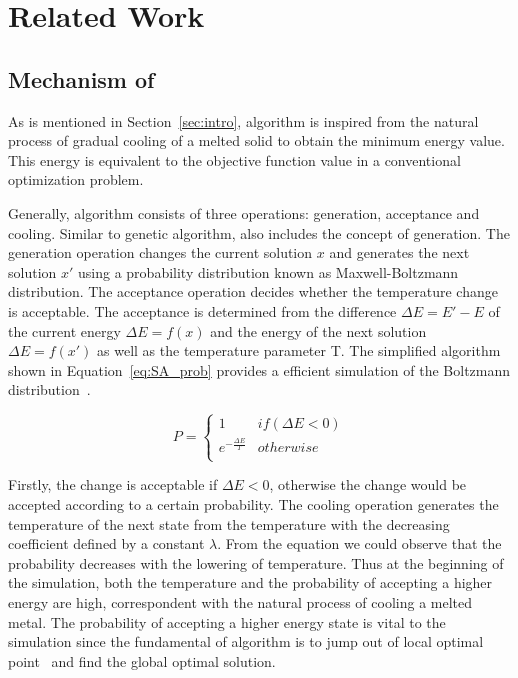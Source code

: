 \section{Related Work}
\label{sec:related}
\subsection{Mechanism of \SA}
As is mentioned in Section~\ref{sec:intro}, \SA algorithm is inspired from the natural process of gradual cooling of a melted solid to obtain the minimum energy value. This energy is equivalent to the objective function value in a conventional optimization problem.

Generally, \SA algorithm consists of three operations: generation, acceptance and cooling. Similar to genetic algorithm, \SA also includes the concept of generation. The generation operation changes the current solution $x$ and generates the next solution $x'$ using a probability distribution known as Maxwell-Boltzmann distribution. The acceptance operation decides whether the temperature change is acceptable. The acceptance is determined from the difference $\Delta E = E'-E$ of the current energy $\Delta E = f(x)$ and the energy of the next solution $\Delta E = f(x')$ as well as the temperature parameter T. The simplified algorithm shown in Equation~\ref{eq:SA_prob} provides a efficient simulation of the Boltzmann distribution~\cite{Hiroyasu:2010}.

\begin{equation}
\label{eq:SA_prob}
P=
\begin{cases}
1 & if(\Delta E < 0) \\
e^{-\frac{\Delta E}{T}}&otherwise \\
\end{cases}
\end{equation}

Firstly, the change is acceptable if $\Delta E < 0$, otherwise the change would be accepted according to a certain probability. The cooling operation generates the temperature of the next state from the temperature with the decreasing coefficient defined by a constant $\lambda$. From the equation we could observe that the probability decreases with the lowering of temperature. Thus at the beginning of the simulation, both the temperature and the probability of accepting a higher energy are high, correspondent with the natural process of cooling a melted metal. The probability of accepting a higher energy state is vital to the \SA simulation since the fundamental of \SA algorithm is to jump out of local optimal point~\cite{Garcia:2009} and find the global optimal solution.
